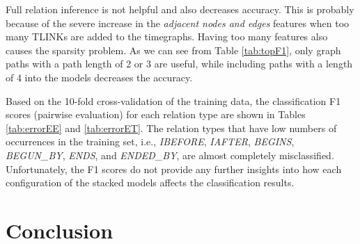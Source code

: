\documentclass[english]{jnlp_1.4}
\begin{document}
Full relation inference is not helpful and also decreases accuracy.
This is probably because of the severe increase in the \emph{adjacent nodes and edges} features when too many TLINKs are added to the timegraphs.
Having too many features also causes the sparsity problem.
As we can see from Table \ref{tab:topF1}, only graph paths with a path length of 2 or 3 are useful, while including paths with a length of 4 into the models decreases the accuracy.

\begin{table}[b]
\label{tab:dictsize}

\end{table}

\begin{table}[b]
\label{tab:errorEE}

\end{table}

Based on the 10-fold cross-validation of the training data, the classification F1 scores (pairwise evaluation) for each relation type are shown in Tables \ref{tab:errorEE} and \ref{tab:errorET}.
The relation types that have low numbers of occurrences in the training set, i.e., \emph{\footnotesize IBEFORE}, \emph{\footnotesize IAFTER}, \emph{\footnotesize BEGINS}, \emph{\footnotesize BEGUN\_BY}, \emph{\footnotesize ENDS}, and \emph{\footnotesize ENDED\_BY}, are almost completely misclassified.
Unfortunately, the F1 scores do not provide any further insights into how each configuration of the stacked models affects the classification results.
\begin{table}[t]
\label{tab:errorET}

\vspace{-1\Cvs}
\end{table}


\section{Conclusion}
\label{sec:conclusion}
\end{document}
